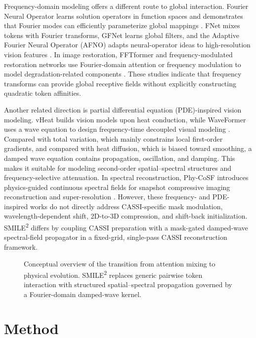 \documentclass[letterpaper]{article} %
\newcommand{\smiletwo}{SMILE\textsuperscript{2}}
\begin{document}
Frequency-domain modeling offers a different route to global interaction.
Fourier Neural Operator learns solution operators in function spaces and demonstrates that Fourier modes can efficiently parameterize global mappings \cite{li2021fno}.
FNet mixes tokens with Fourier transforms, GFNet learns global filters, and the Adaptive Fourier Neural Operator (AFNO) adapts neural-operator ideas to high-resolution vision features \cite{leethorp2022fnet,rao2021gfnet,guibas2022afno}.
In image restoration, FFTformer and frequency-modulated restoration networks use Fourier-domain attention or frequency modulation to model degradation-related components \cite{kong2023fftformer,cui2024csnet}.
These studies indicate that frequency transforms can provide global receptive fields without explicitly constructing quadratic token affinities.

Another related direction is partial differential equation (PDE)-inspired vision modeling.
vHeat builds vision models upon heat conduction, while WaveFormer uses a wave equation to design frequency-time decoupled visual modeling \cite{wang2024vheat,shu2026waveformer}.
Compared with total variation, which mainly constrains local first-order gradients, and compared with heat diffusion, which is biased toward smoothing, a damped wave equation contains propagation, oscillation, and damping.
This makes it suitable for modeling second-order spatial--spectral structures and frequency-selective attenuation.
In spectral reconstruction, Phy-CoSF introduces physics-guided continuous spectral fields for snapshot compressive imaging reconstruction and super-resolution \cite{chen2026phycosf}.
However, these frequency- and PDE-inspired works do not directly address CASSI-specific mask modulation, wavelength-dependent shift, 2D-to-3D compression, and shift-back initialization.
\smiletwo{} differs by coupling CASSI preparation with a mask-gated damped-wave spectral-field propagator in a fixed-grid, single-pass CASSI reconstruction framework.

\begin{figure}[!t]
  \centering
  \fbox{\rule{0pt}{1.75in}\rule{0.94\textwidth}{0pt}}
  \caption{Conceptual overview of the transition from attention mixing to physical evolution. \smiletwo{} replaces generic pairwise token interaction with structured spatial--spectral propagation governed by a Fourier-domain damped-wave kernel.}
  \label{fig:overall}
\end{figure}

\section{Method}
\end{document}
